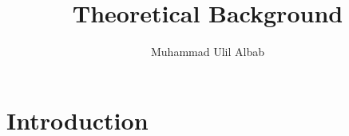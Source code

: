 \documentclass{report}
\title{Theoretical Background}
\author{Muhammad Ulil Albab}
\begin{document}
\maketitle
 
    










\section*{Introduction}
\end{document}
